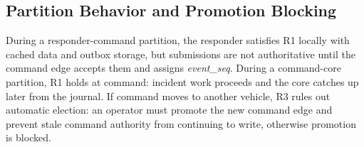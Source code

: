 \subsection{Partition Behavior and Promotion Blocking}
\label{sec:protocol-partition}

During a responder-command partition, the responder satisfies R1 locally with
cached data and outbox storage, but submissions are not authoritative until the
command edge accepts them and assigns \textit{event\_seq}. During a command-core
partition, R1 holds at command: incident work proceeds and the core catches up
later from the journal. If command moves to another vehicle, R3 rules out
automatic election: an operator must promote the new command edge and prevent
stale command authority from continuing to write, otherwise promotion is blocked.
